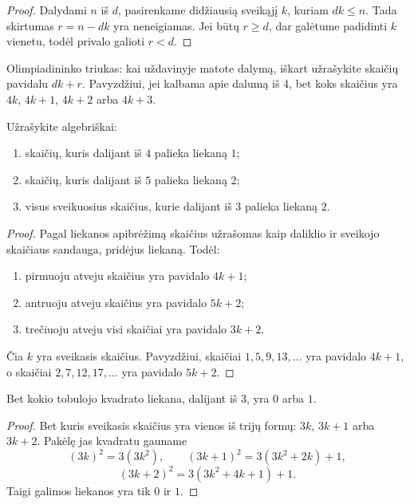 \documentclass[11pt,a4paper]{scrartcl}
\begin{document}
\begin{proof}
Dalydami $n$ iš $d$, pasirenkame didžiausią sveikąjį $k$, kuriam $dk \le n$. Tada skirtumas $r=n-dk$ yra neneigiamas. Jei būtų $r \ge d$, dar galėtume padidinti $k$ vienetu, todėl privalo galioti $r<d$.
\end{proof}

\begin{remark*}
Olimpiadininko triukas: kai uždavinyje matote dalymą, iškart užrašykite skaičių pavidalu \(dk + r\). Pavyzdžiui, jei kalbama apie dalumą iš 4, bet koks skaičius yra $4k$, \(4k+1\), \(4k+2\) arba \(4k+3\). 
\end{remark*}

\begin{example}
Užrašykite algebriškai:
\begin{enumerate}
    \item skaičių, kuris dalijant iš $4$ palieka liekaną $1$;
    \item skaičių, kuris dalijant iš $5$ palieka liekaną $2$;
    \item visus sveikuosius skaičius, kurie dalijant iš $3$ palieka liekaną $2$.
\end{enumerate}
\end{example}

\begin{proof}
Pagal liekanos apibrėžimą skaičius užrašomas kaip daliklio ir sveikojo skaičiaus sandauga, pridėjus liekaną. Todėl:
\begin{enumerate}
    \item pirmuoju atveju skaičius yra pavidalo $4k+1$;
    \item antruoju atveju skaičius yra pavidalo $5k+2$;
    \item trečiuoju atveju visi skaičiai yra pavidalo $3k+2$.
\end{enumerate}
Čia $k$ yra sveikasis skaičius. Pavyzdžiui, skaičiai $1,5,9,13,\ldots$ yra pavidalo $4k+1$, o skaičiai $2,7,12,17,\ldots$ yra pavidalo $5k+2$.
\end{proof}

\begin{proposition}
Bet kokio tobulojo kvadrato liekana, dalijant iš $3$, yra $0$ arba $1$.
\end{proposition}

\begin{proof}
Bet kuris sveikasis skaičius yra vienos iš trijų formų: $3k$, $3k+1$ arba $3k+2$. Pakėlę jas kvadratu gauname
\[
(3k)^2=3(3k^2),\qquad (3k+1)^2=3(3k^2+2k)+1,
\]
\[
(3k+2)^2=3(3k^2+4k+1)+1.
\]
Taigi galimos liekanos yra tik $0$ ir $1$.
\end{proof}
\end{document}
